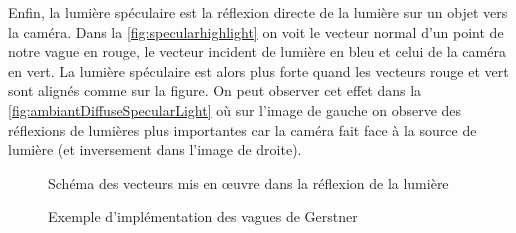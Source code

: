 Enfin, la lumière spéculaire est la réflexion directe de la lumière sur un objet vers la caméra. Dans la \autoref{fig:specularhighlight} on voit le vecteur normal d'un point de notre vague en rouge, le vecteur incident de lumière en bleu et celui de la caméra en vert. La lumière spéculaire est alors plus forte quand les vecteurs rouge et vert sont alignés comme sur la figure.
On peut observer cet effet dans la \autoref{fig:ambiantDiffuseSpecularLight} où sur l'image de gauche on observe des réflexions de lumières plus importantes car la caméra fait face à la source de lumière (et inversement dans l'image de droite).
\begin{figure}[H]
	\centering
	\caption{Schéma des vecteurs mis en œuvre dans la réflexion de la lumière}
	\label{fig:specularhighlight}
\end{figure}

\begin{figure}[H]			
	\caption{Exemple d'implémentation des vagues de Gerstner}
	\label{fig:ambiantDiffuseSpecularLight}
\end{figure}

